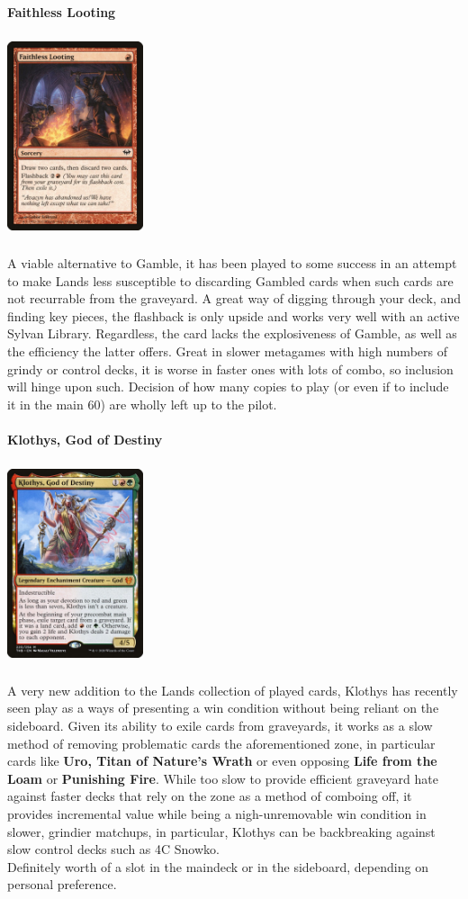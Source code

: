 \documentclass{report}
\begin{document}
\textbf{Faithless Looting\\}
\begin{center}
\includegraphics [width = 4cm, height = 6cm] {faithless-looting}
\end{center}
A viable alternative to Gamble, it has been played to some success in an attempt to make Lands less susceptible to discarding Gambled cards when such cards are not recurrable from the graveyard. A great way of digging through your deck, and finding key pieces, the flashback is only upside and works very well with an active Sylvan Library. Regardless, the card lacks the explosiveness of Gamble, as well as the efficiency the latter offers. Great in slower metagames with high numbers of grindy or control decks, it is worse in faster ones with lots of combo, so inclusion will hinge upon such. Decision of how many copies to play (or even if to include it in the main 60) are wholly left up to the pilot.\\\\
\textbf{Klothys, God of Destiny}
\begin{center}
\includegraphics [width = 4cm, height = 6cm] {klothys}
\end{center}
A very new addition to the Lands collection of played cards, Klothys has recently seen play as a ways of presenting a win condition without being reliant on the sideboard. Given its ability to exile cards from graveyards, it works as a slow method of removing problematic cards the aforementioned zone, in particular cards like \textbf{Uro, Titan of Nature's Wrath} or even opposing \textbf{Life from the Loam} or \textbf{Punishing Fire}. While too slow to provide efficient graveyard hate against faster decks that rely on the zone as a method of comboing off, it provides incremental value while being a nigh-unremovable win condition in slower, grindier matchups, in particular, Klothys can be backbreaking against slow control decks such as 4C Snowko.\\ Definitely worth of a slot in the maindeck or in the sideboard, depending on personal preference.\\\\
\end{document}
